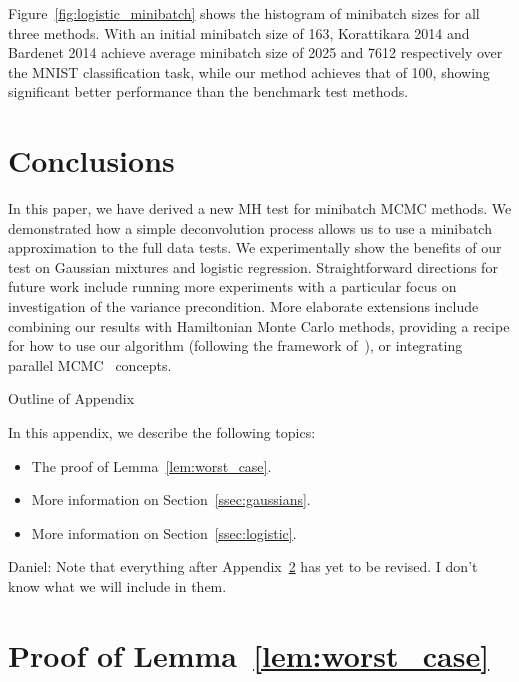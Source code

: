 \documentclass{article}
\begin{document}
Figure~\ref{fig:logistic_minibatch} shows the histogram of minibatch sizes for
all three methods. With an initial minibatch size of 163, Korattikara 2014 and
Bardenet 2014 achieve average minibatch size of 2025 and 7612 respectively over
the MNIST classification task, while our method achieves that of 100, showing
significant better performance than the benchmark test methods.



\section{Conclusions}\label{sec:conclusion}

In this paper, we have derived a new MH test for minibatch MCMC methods. We demonstrated how a
simple deconvolution process allows us to use a minibatch approximation to the full data tests. We
experimentally show the benefits of our test on Gaussian mixtures and logistic regression.
Straightforward directions for future work include running more experiments with a
particular focus on investigation of the variance precondition.  More elaborate extensions include
combining our results with Hamiltonian Monte Carlo methods, providing a recipe for how to use our
algorithm (following the framework of~\cite{sgmcmc_2015}), or integrating parallel
MCMC~\cite{conf/uai/AngelinoKWSA14,conf/icml/AhnSW14} concepts.


\small


\normalsize

\clearpage
\appendix

\begin{center}
{\Large Outline of Appendix}
\end{center}

In this appendix, we describe the following topics:

\begin{itemize}[noitemsep]
    \item The proof of Lemma~\ref{lem:worst_case}.
    \item More information on Section~\ref{ssec:gaussians}.
    \item More information on Section~\ref{ssec:logistic}.
\end{itemize}

{\color{blue} Daniel: Note that everything after
Appendix~\ref{app:worst_case_proof} has yet to be revised. I don't know what we
will include in them.}

\section{Proof of Lemma~\ref{lem:worst_case}}\label{app:worst_case_proof}
\end{document}
